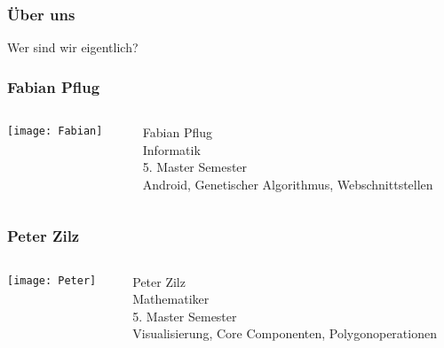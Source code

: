 
\begin{frame}
    \frametitle{Über uns}
    \begin{center}
    \huge{Wer sind wir eigentlich?}
    \end{center}
\end{frame}


\begin{frame}
    \frametitle{Fabian Pflug}
	\begin{columns}
		\begin{column}{0.3\textwidth}
			\texttt{[image: Fabian]}
		\end{column}
		\begin{column}{0.7\textwidth}
			Fabian Pflug\\

			Informatik\\

			5. Master Semester\\

			Android, Genetischer Algorithmus, Webschnittstellen

		\end{column}
	\end{columns}
\end{frame}
\begin{frame}
    \frametitle{Peter Zilz}
	\begin{columns}
		\begin{column}{0.3\textwidth}
			\texttt{[image: Peter]}
		\end{column}
		\begin{column}{0.7\textwidth}
			Peter Zilz\\

			Mathematiker\\

			5. Master Semester\\

			Visualisierung, Core Componenten, Polygonoperationen

		\end{column}
	\end{columns}
\end{frame}


